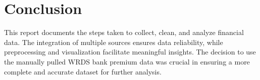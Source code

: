 \documentclass{article}
\begin{document}
\section{Conclusion}
This report documents the steps taken to collect, clean, and analyze financial data. The integration of multiple sources ensures data reliability, while preprocessing and visualization facilitate meaningful insights. The decision to use the manually pulled WRDS bank premium data was crucial in ensuring a more complete and accurate dataset for further analysis.
\end{document}
